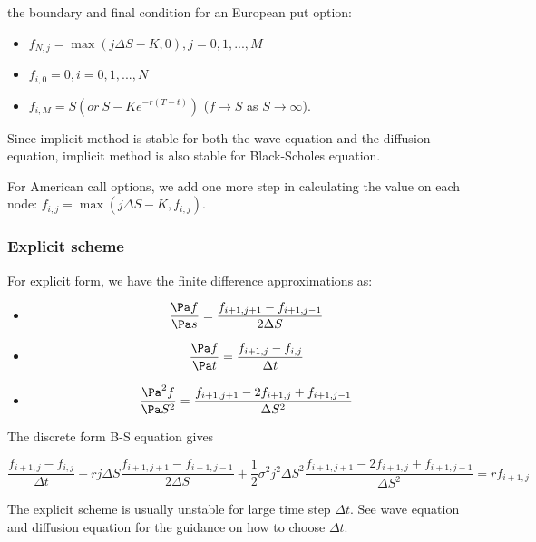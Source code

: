 \begin{refsection}
\begin{remark}\cite[47]{Lalley2001mathematical}
the boundary and final condition for an European put option:
\begin{itemize}
	\item $f_{N,j} = \max(j\Delta S - K,0),j=0,1,...,M$
	\item $f_{i,0} = 0,i=0,1,...,N$
	\item $f_{i,M}= S(or ~ S-Ke^{-r(T-t)})$ ($f\to S$ as $S \to \infty$).
\end{itemize}
\end{remark}


\begin{remark}[stability]
Since implicit method is stable for both the wave equation and the diffusion equation, implicit method is also stable for Black-Scholes equation.
\end{remark}



\begin{remark}
For American call options, we add one more step in calculating the value on each node: $f_{i,j} = \max(j\Delta S - K, f_{i,j})$.
\end{remark}


\subsubsection{Explicit scheme}
\begin{definition}
For explicit form, we have the finite difference approximations as:
\begin{itemize}
	\item $$\frac{\Pa f}{\Pa s} = \frac{f_{i+1,j+1}-f_{i+1,j-1}}{2\Delta S}$$
	\item $$\frac{\Pa f}{\Pa t} = \frac{f_{i+1,j}-f_{i,j}}{\Delta t}$$
	\item $$\frac{\Pa^2 f}{\Pa S^2} = \frac{f_{i+1,j+1}-2f_{i+1,j}+f_{i+1,j-1}}{\Delta S^2}$$
\end{itemize}

The discrete form B-S equation gives

$$\frac{f_{i+1,j}-f_{i,j}}{\Delta t} + rj\Delta S \frac{f_{i+1,j+1}-f_{i+1,j-1}}{2\Delta S} + \frac{1}{2}\sigma^2j^2\Delta S^2 \frac{f_{i+1,j+1}-2f_{i+1,j}+f_{i+1,j-1}}{\Delta S^2} = rf_{i+1,j}$$
\end{definition}

\begin{remark}[stability]
The explicit scheme is usually unstable for large time step $\Delta t$. See wave equation and diffusion equation for the guidance on how to choose $\Delta t$.
\end{remark}



\end{refsection}

